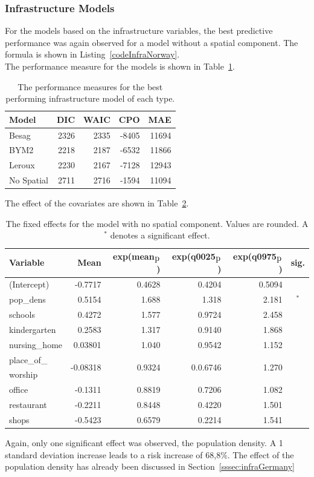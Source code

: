 \subsubsection{Infrastructure Models}
For the models based on the infrastructure variables, the best predictive performance was again observed for a model without a spatial component. The formula is shown in Listing~\ref{codeInfraNorway}. \\
The performance measure for the models is shown in Table~\ref{infraNorway}.
\begin{table}[H] 
\caption{The performance measures for the best performing infrastructure model of each type. \label{infraNorway}}
\begin{tabular}{l r r r r}
\toprule
\textbf{Model}	& \textbf{DIC}	& \textbf{WAIC} & \textbf{CPO} & \textbf{MAE} \\
\midrule
Besag  & 2326 & 2335 & -8405 & 11694 \\
BYM2 & 2218 & 2187 & -6532 & 11866\\
Leroux &  2230 & 2167 & -7128 & 12943\\
No Spatial & 2711 & 2716 & -1594 & 11094 \\
\bottomrule
\end{tabular}
\end{table}
The effect of the covariates are shown in Table~\ref{fixedInfraNorway}.
\begin{table}[H] 
\caption{The fixed effects for the model with no spatial component. Values are rounded. A $^*$ denotes a significant effect.\label{fixedInfraNorway}}
\begin{tabular}{l r r r r c}
\toprule
\textbf{Variable}	& \textbf{Mean}	& \textbf{exp(mean$_{\hbox{p}}$)} & \textbf{exp(q0025$_{\hbox{p}}$)} & \textbf{exp(q0975$_{\hbox{p}}$)} & \textbf{sig.}\\
\midrule
(Intercept) & -0.7717 & 0.4628 & 0.4204 & 0.5094 &\\
pop\_dens & 0.5154 & 1.688 & 1.318 & 2.181 & $^*$ \\
schools & 0.4272 & 1.577 & 0.9724 & 2.458 & \\
kindergarten & 0.2583 & 1.317 & 0.9140 & 1.868 \\
nursing\_home & 0.03801 & 1.040 & 0.9542 & 1.152 \\
place\_of\_ & \multirow{2}{*}{-0.08318} & \multirow{2}{*}{0.9324} & \multirow{2}{*}{0.0.6746} & \multirow{2}{*}{1.270} & \multirow{2}{*}{}\\
worship\\
office &-0.1311 & 0.8819 & 0.7206 & 1.082\\
restaurant & -0.2211 & 0.8448 & 0.4220 & 1.501 & \\
shops & -0.5423 &0.6579 & 0.2214 & 1.541 & \\
\bottomrule
\end{tabular}
\end{table}
Again, only one significant effect was observed, the population density. A 1 standard deviation increase leads to a risk increase of 68,8\%. The effect of the population density  has already been discussed in Section~\ref{sssec:infraGermany}

